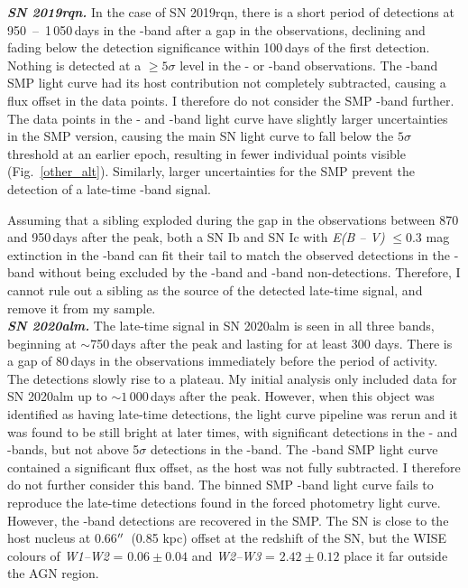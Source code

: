 \documentclass[a4paper,oneside,12pt, class=Latex/Classes/PhDthesisPSnPDF, crop=false]{standalone}
\begin{document}
\textit{\textbf{SN 2019rqn.}}
In the case of SN 2019rqn, there is a short period of detections at 950~--~1\,050\,days in the \ztfr-band after a gap in the observations, declining and fading below the detection significance within 100\,days of the first detection. Nothing is detected at a $\geq 5 \sigma$ level in the \ztfg- or \ztfi-band observations. The \ztfi-band SMP light curve had its host contribution not completely subtracted, causing a flux offset in the data points. I therefore do not consider the SMP \ztfi-band further. The data points in the \ztfg- and \ztfr-band light curve have slightly larger uncertainties in the SMP version, causing the main SN light curve to fall below the $5\sigma$ threshold at an earlier epoch, resulting in fewer individual points visible (Fig.~\ref{other_alt}). Similarly, larger uncertainties for the SMP prevent the detection of a late-time \ztfr-band signal.

Assuming that a sibling exploded during the gap in the observations between 870 and 950\,days after the peak, both a SN Ib and SN Ic with \textit{E(B -- V)} $\leq 0.3$ mag extinction in the \ztfr-band can fit their tail to match the observed detections in the \ztfr-band without being excluded by the \ztfg-band and \ztfi-band non-detections. Therefore, I cannot rule out a sibling as the source of the detected late-time signal, and remove it from my sample.\\

\textit{\textbf{SN 2020alm.}}
The late-time signal in SN 2020alm is seen in all three bands, beginning at $\sim$750\,days after the peak and lasting for at least 300 days. There is a gap of 80\,days in the observations immediately before the period of activity. The detections slowly rise to a plateau. My initial analysis only included data for SN 2020alm up to $\sim1\,000$\,days after the peak. However, when this object was identified as having late-time detections, the light curve pipeline was rerun and it was found to be still bright at later times, with significant detections in the \ztfr- and \ztfi-bands, but not above 5$\sigma$ detections in the \ztfg-band. The \ztfi-band SMP light curve contained a significant flux offset, as the host was not fully subtracted. I therefore do not further consider this band. The binned SMP \ztfr-band light curve fails to reproduce the late-time detections found in the forced photometry light curve. However, the \ztfg-band detections are recovered in the SMP. The SN is close to the host nucleus at 0.66$^{\prime\prime}$~(0.85 kpc) offset at the redshift of the SN, but the WISE colours of \textit{W1--W2} = $0.06\pm0.04$ and \textit{W2--W3} = $2.42\pm0.12$ place it far outside the AGN region.
\end{document}
